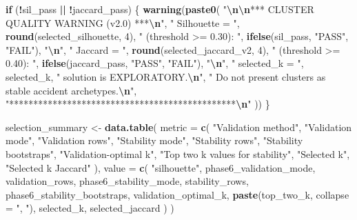 \documentclass[
]{article}
\newenvironment{Shaded}{\begin{snugshade}}{\end{snugshade}}
\newcommand{\AttributeTok}[1]{\textcolor[rgb]{0.13,0.29,0.53}{#1}}
\newcommand{\ControlFlowTok}[1]{\textcolor[rgb]{0.13,0.29,0.53}{\textbf{#1}}}
\newcommand{\DecValTok}[1]{\textcolor[rgb]{0.00,0.00,0.81}{#1}}
\newcommand{\FunctionTok}[1]{\textcolor[rgb]{0.13,0.29,0.53}{\textbf{#1}}}
\newcommand{\NormalTok}[1]{#1}
\newcommand{\OtherTok}[1]{\textcolor[rgb]{0.56,0.35,0.01}{#1}}
\newcommand{\SpecialCharTok}[1]{\textcolor[rgb]{0.81,0.36,0.00}{\textbf{#1}}}
\newcommand{\StringTok}[1]{\textcolor[rgb]{0.31,0.60,0.02}{#1}}
\begin{document}
\begin{Shaded}
\begin{Highlighting}[]
\ControlFlowTok{if}\NormalTok{ (}\SpecialCharTok{!}\NormalTok{sil\_pass }\SpecialCharTok{||} \SpecialCharTok{!}\NormalTok{jaccard\_pass) \{}
  \FunctionTok{warning}\NormalTok{(}\FunctionTok{paste0}\NormalTok{(}
    \StringTok{"}\SpecialCharTok{\textbackslash{}n\textbackslash{}n}\StringTok{*** CLUSTER QUALITY WARNING (v2.0) ***}\SpecialCharTok{\textbackslash{}n}\StringTok{"}\NormalTok{,}
    \StringTok{"  Silhouette = "}\NormalTok{, }\FunctionTok{round}\NormalTok{(selected\_silhouette, }\DecValTok{4}\NormalTok{),}
    \StringTok{" (threshold \textgreater{}= 0.30): "}\NormalTok{, }\FunctionTok{ifelse}\NormalTok{(sil\_pass, }\StringTok{"PASS"}\NormalTok{, }\StringTok{"FAIL"}\NormalTok{), }\StringTok{"}\SpecialCharTok{\textbackslash{}n}\StringTok{"}\NormalTok{,}
    \StringTok{"  Jaccard    = "}\NormalTok{, }\FunctionTok{round}\NormalTok{(selected\_jaccard\_v2, }\DecValTok{4}\NormalTok{),}
    \StringTok{" (threshold \textgreater{}= 0.40): "}\NormalTok{, }\FunctionTok{ifelse}\NormalTok{(jaccard\_pass, }\StringTok{"PASS"}\NormalTok{, }\StringTok{"FAIL"}\NormalTok{), }\StringTok{"}\SpecialCharTok{\textbackslash{}n}\StringTok{"}\NormalTok{,}
    \StringTok{"  selected\_k = "}\NormalTok{, selected\_k,}
    \StringTok{" solution is EXPLORATORY.}\SpecialCharTok{\textbackslash{}n}\StringTok{"}\NormalTok{,}
    \StringTok{"  Do not present clusters as stable accident archetypes.}\SpecialCharTok{\textbackslash{}n}\StringTok{"}\NormalTok{,}
    \StringTok{"***********************************************}\SpecialCharTok{\textbackslash{}n}\StringTok{"}
\NormalTok{  ))}
\NormalTok{\}}

\NormalTok{selection\_summary }\OtherTok{\textless{}{-}} \FunctionTok{data.table}\NormalTok{(}
  \AttributeTok{metric =} \FunctionTok{c}\NormalTok{(}
    \StringTok{"Validation method"}\NormalTok{,}
    \StringTok{"Validation mode"}\NormalTok{,}
    \StringTok{"Validation rows"}\NormalTok{,}
    \StringTok{"Stability mode"}\NormalTok{,}
    \StringTok{"Stability rows"}\NormalTok{,}
    \StringTok{"Stability bootstraps"}\NormalTok{,}
    \StringTok{"Validation{-}optimal k"}\NormalTok{,}
    \StringTok{"Top two k values for stability"}\NormalTok{,}
    \StringTok{"Selected k"}\NormalTok{,}
    \StringTok{"Selected k Jaccard"}
\NormalTok{  ),}
  \AttributeTok{value =} \FunctionTok{c}\NormalTok{(}
    \StringTok{"silhouette"}\NormalTok{,}
\NormalTok{    phase6\_validation\_mode,}
\NormalTok{    validation\_rows,}
\NormalTok{    phase6\_stability\_mode,}
\NormalTok{    stability\_rows,}
\NormalTok{    phase6\_stability\_bootstraps,}
\NormalTok{    validation\_optimal\_k,}
    \FunctionTok{paste}\NormalTok{(top\_two\_k, }\AttributeTok{collapse =} \StringTok{", "}\NormalTok{),}
\NormalTok{    selected\_k,}
\NormalTok{    selected\_jaccard}
\NormalTok{  )}
\NormalTok{)}


\end{Highlighting}
\end{Shaded}
\end{document}
